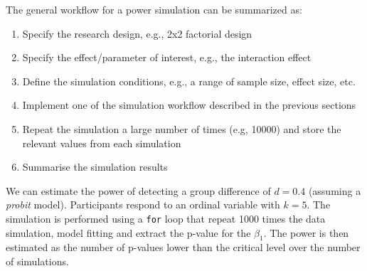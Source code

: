 \documentclass[
  man,floatsintext]{apa6}
\providecommand{\tightlist}{%
  \setlength{\itemsep}{0pt}\setlength{\parskip}{0pt}}
\begin{document}
The general workflow for a power simulation can be summarized as:

\begin{enumerate}
\def\labelenumi{\arabic{enumi}.}
\tightlist
\item
  Specify the research design, e.g., 2x2 factorial design
\item
  Specify the effect/parameter of interest, e.g., the interaction effect
\item
  Define the simulation conditions, e.g., a range of sample size, effect size, etc.
\item
  Implement one of the simulation workflow described in the previous sections
\item
  Repeat the simulation a large number of times (e.g, 10000) and store the relevant values from each simulation
\item
  Summarise the simulation results
\end{enumerate}

We can estimate the power of detecting a group difference of \(d = 0.4\) (assuming a \emph{probit} model). Participants respond to an ordinal variable with \(k = 5\). The simulation is performed using a \texttt{for} loop that repeat 1000 times the data simulation, model fitting and extract the p-value for the \(\beta_1\). The power is then estimated as the number of p-values lower than the critical level over the number of simulations.

\scriptsize
\end{document}
